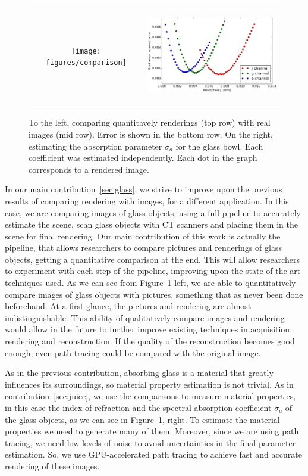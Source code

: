 \begin{figure}
\begin{tabular}{@{}c@{}c@{}}
	 \texttt{[image: figures/comparison]} & \hspace{2em}
	 \includegraphics[height=4.3cm]{figures/glass_bowl_analysis_by_synthesis}  \\
\end{tabular}
\caption{To the left, comparing quantitavely renderings (top row) with real images (mid row). Error is shown in the bottom row. On the right, estimating the absorption parameter $\sigma_a$ for the glass bowl. Each coefficient was estimated independently. Each dot in the graph corresponds to a rendered image. }
\label{fig:glasscomparison}
\end{figure}
In our main contribution~\ref{sec:glass}, we strive to improve upon the previous results of comparing rendering with images, for a different application. In this case, we are comparing images of glass objects, using a full pipeline to accurately estimate the scene, scan glass objects with CT scanners and placing them in the scene for final rendering. Our main contribution of this work is actually the pipeline, that allows researchers to compare pictures and renderings of glass objects, getting a quantitative comparison at the end. This will allow researchers to experiment with each step of the pipeline, improving upon the state of the art techniques used. As we can see from Figure~\ref{fig:glasscomparison} left, we are able to quantitatively compare images of glass objects with pictures, something that as never been done beforehand. At a first glance, the pictures and rendering are almost indistinguishable. This ability of qualitatively compare images and rendering would allow in the future to further improve existing techniques in acquisition, rendering and reconstruction. If the quality of the reconstruction becomes good enough, even path tracing could be compared with the original image. 

As in the previous contribution, absorbing glass is a material that greatly influences its surroundings, so material property estimation is not trivial. As in contribution~\ref{sec:juice}, we use the comparisons to measure material properties, in this case the index of refraction and the spectral absorption coefficient $\sigma_a$ of the glass objects, as we can see in Figure~\ref{fig:glasscomparison}, right. To estimate the material properties we need to generate many of them. Moreover, since we are using path tracing, we need low levels of noise to avoid uncertainties in the final parameter estimation. So, we use GPU-accelerated path tracing to achieve fast and accurate rendering of these images. 



